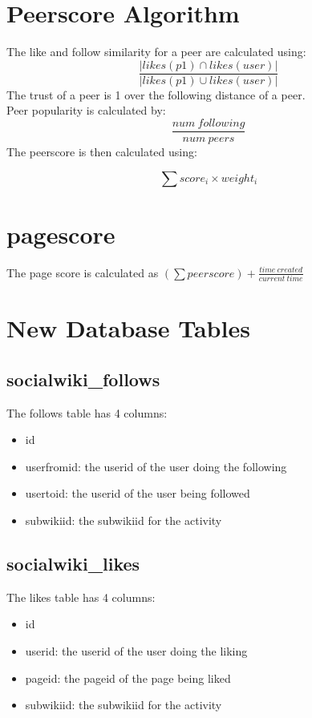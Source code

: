 \documentclass[letterpaper,twoside,12pt]{report}
\begin{document}
\section{Peerscore Algorithm}
	The like and follow similarity for a peer are calculated using: 
		\[
		\frac{|likes (p1)\cap likes(user)|}{|likes(p1)\cup likes (user)|}
	\]
	The trust of a peer is 1 over the following distance of a peer.
	\newline
	\\Peer popularity is calculated by: 
		\[
		\frac{num\ following}{num\ peers}
	\]
	The peerscore is then calculated using:
	
		\[
		\sum score_i\times weight_i
	\]
	
	\section{pagescore}
	The page score is calculated as $(\sum peerscore)+\frac{time\ created}{current\ time} $
	
	 \section{New Database Tables}
	\subsection{socialwiki\_follows}
	The follows table has 4 columns:
	\begin{itemize}
		\item id
		\item userfromid: the userid of the user doing the following
		\item usertoid: the userid of the user being followed
		\item subwikiid: the subwikiid for the activity
	\end{itemize}
	\subsection{socialwiki\_likes}
	The likes table has 4 columns:
	\begin{itemize}
		\item id
		\item userid: the userid of the user doing the liking
		\item pageid: the pageid of the page being liked
		\item subwikiid: the subwikiid for the activity 
	\end{itemize}
	
\end{document}
